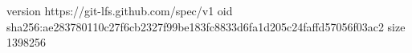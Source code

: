 version https://git-lfs.github.com/spec/v1
oid sha256:ae283780110c27f6cb2327f99be183fc8833d6fa1d205c24faffd57056f03ac2
size 1398256
